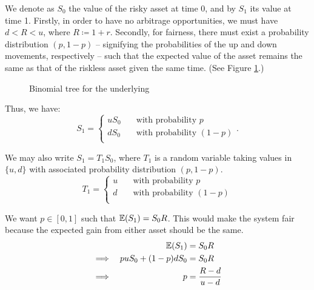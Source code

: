 We denote as $ S_0 $ the value of the risky asset at time 0, and by $ S_1 $ its value at time 1. Firstly, in order to have no arbitrage opportunities, we must have $ d < R < u $, where $ R \coloneqq 1 + r $. Secondly, for fairness, there must exist a probability distribution $ (p, 1-p) $ -- signifying the probabilities of the up and down movements, respectively -- such that the expected value of the asset remains the same as that of the riskless asset given the same time. (See Figure \ref{fig:discrete-2tr-underlying}.)


\begin{figure}[h]
	
	\caption{Binomial tree for the underlying}
	\label{fig:discrete-2tr-underlying}
\end{figure}


Thus, we have:
\begin{equation*}
	S_1 =
	\begin{cases}
		u S_0 & \quad \text{with probability } p \\
		d S_0 & \quad \text{with probability } (1 - p) \\		
	\end{cases} .
\end{equation*}

We may also write $ S_1 = T_1 S_0 $, where $ T_1 $ is a random variable taking values in $ \{ u, d \} $ with associated probability distribution $ (p, 1-p) $.
\begin{equation*}
	T_1 =
	\begin{cases}
		u  & \quad \text{with probability } p \\
		d  & \quad \text{with probability } (1 - p) \\		
	\end{cases}
\end{equation*}


We want $ p \in [0,1] $ such that $ \operatorname{\mathbb{E}}(S_1) = S_0 R $. This would make the system fair because the expected gain from either asset should be the same.
\begin{alignat}{9}
	          &&  \operatorname{\mathbb{E}}(S_1) &= S_0 R \\
	\implies  &&   p u S_0 + ( 1 - p ) d S_0  & =  S_0 R \nonumber \\
	\implies  &&  p  & =  \frac{R - d}{u - d}    \label{eq:discrete-pr}
\end{alignat}

